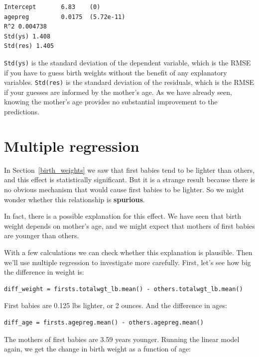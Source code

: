 \documentclass[12pt]{book}
\begin{document}
\begin{verbatim}
Intercept       6.83    (0)
agepreg         0.0175  (5.72e-11)
R^2 0.004738
Std(ys) 1.408
Std(res) 1.405
\end{verbatim}

{\tt Std(ys)} is the standard deviation of the dependent variable,
which is the RMSE if you have to guess birth weights without the benefit of
any explanatory variables.  {\tt Std(res)} is the standard deviation
of the residuals, which is the RMSE if your guesses are informed
by the mother's age.  As we have already seen, knowing the mother's
age provides no substantial improvement to the predictions.


\section{Multiple regression}
\label{multiple}

In Section~\ref{birth_weights} we saw that first babies tend to be
lighter than others, and this effect is statistically significant.
But it is a strange result because there is no obvious mechanism that
would cause first babies to be lighter.  So we might wonder whether
this relationship is {\bf spurious}.

In fact, there is a possible explanation for this effect.  We have
seen that birth weight depends on mother's age, and we might expect
that mothers of first babies are younger than others.

With a few calculations we can check whether this explanation
is plausible.  Then we'll use multiple regression to investigate
more carefully.  First, let's see how big the difference in weight
is:

\begin{verbatim}
diff_weight = firsts.totalwgt_lb.mean() - others.totalwgt_lb.mean()
\end{verbatim}

First babies are 0.125 lbs lighter, or 2 ounces.  And the difference
in ages:

\begin{verbatim}
diff_age = firsts.agepreg.mean() - others.agepreg.mean()
\end{verbatim}

The mothers of first babies are 3.59 years younger.  Running the
linear model again, we get the change in birth weight as a function
of age:
\end{document}

